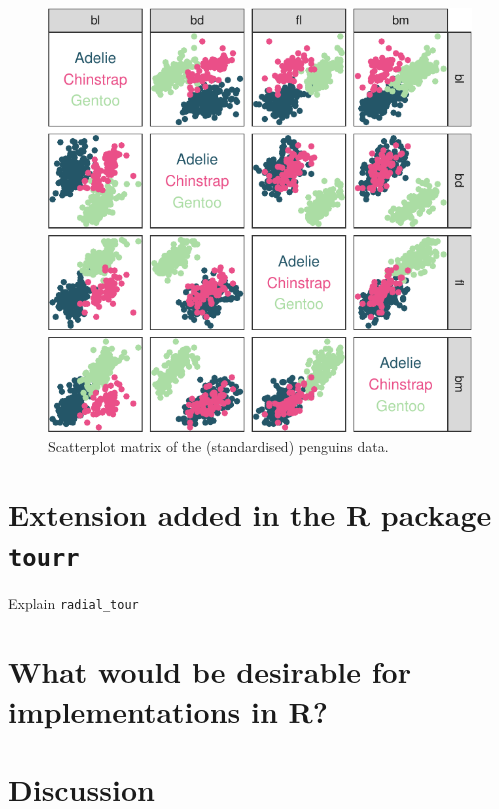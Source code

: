 \documentclass[]{interact}
\theoremstyle{plain}%
\theoremstyle{definition}
\theoremstyle{remark}
\begin{document}
\begin{figure}
\includegraphics[width=1\linewidth]{paper_files/figure-latex/penguins-scatmat-1} \caption{Scatterplot matrix of the (standardised) penguins data.}\label{fig:penguins-scatmat}
\end{figure}

\hypertarget{extension-added-in-the-r-package-tourr}{%
\section{\texorpdfstring{Extension added in the R package
\texttt{tourr}}{Extension added in the R package tourr}}\label{extension-added-in-the-r-package-tourr}}

Explain \texttt{radial\_tour}

\hypertarget{what-would-be-desirable-for-implementations-in-r}{%
\section{What would be desirable for implementations in
R?}\label{what-would-be-desirable-for-implementations-in-r}}

\hypertarget{sec:discussion}{%
\section{Discussion}\label{sec:discussion}}
\end{document}
